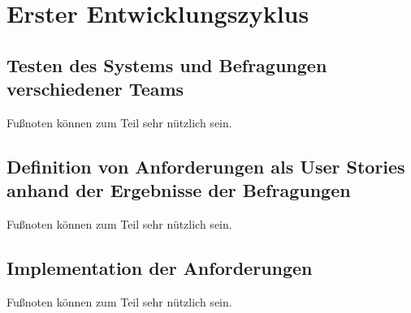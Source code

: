 \chapter{Erster Entwicklungszyklus}
\label{cha:erster_entwicklungszyklus}

\section{Testen des Systems und Befragungen verschiedener Teams} 
\label{sec:erster_testen_befragen}
Fußnoten können zum Teil sehr nützlich sein. 

\section{Definition von Anforderungen als User Stories anhand der Ergebnisse der Befragungen} 
\label{sec:erster_anforderungen_user_stories}
Fußnoten können zum Teil sehr nützlich sein. 

\section{Implementation der Anforderungen} 
\label{sec:erster_implementation}
Fußnoten können zum Teil sehr nützlich sein. 

